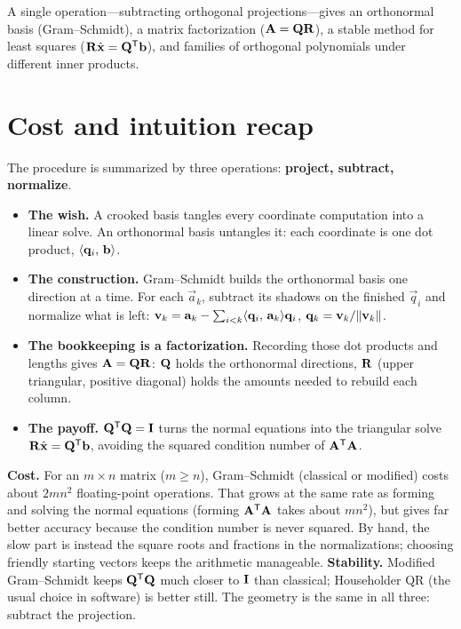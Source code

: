 \begin{aestheticbox}
A single operation---subtracting orthogonal projections---gives an orthonormal basis
(Gram--Schmidt), a matrix factorization ($\mathbf{A}=\mathbf{Q}\mathbf{R}$), a stable method for
least squares ($\mathbf{R}\hat{\mathbf{x}}=\mathbf{Q}^{\mathsf{T}}\mathbf{b}$), and families of orthogonal
polynomials under different inner products.
\end{aestheticbox}

\section{Cost and intuition recap}

The procedure is summarized by three operations: \textbf{project, subtract, normalize}.

\begin{itemize}
  \item \textbf{The wish.} A crooked basis tangles every coordinate computation into a
        linear solve. An orthonormal basis untangles it: each coordinate is one dot
        product, $\langle \mathbf{q}_i,\, \mathbf{b} \rangle$.
  \item \textbf{The construction.} Gram--Schmidt builds the orthonormal basis one
        direction at a time. For each $\vec{a}_k$, subtract its shadows on the finished
        $\vec{q}_i$ and normalize what is left:
        $\mathbf{v}_k=\mathbf{a}_k-\sum_{i<k}\langle \mathbf{q}_i,\, \mathbf{a}_k \rangle\mathbf{q}_i$,
        $\mathbf{q}_k=\mathbf{v}_k/\lVert\mathbf{v}_k\rVert$.
  \item \textbf{The bookkeeping is a factorization.} Recording those dot products and
        lengths gives $\mathbf{A}=\mathbf{Q}\mathbf{R}$: $\mathbf{Q}$ holds the orthonormal directions,
        $\mathbf{R}$ (upper triangular, positive diagonal) holds the amounts needed to rebuild each column.
  \item \textbf{The payoff.} $\mathbf{Q}^{\mathsf{T}}\mathbf{Q}=\mathbf{I}$ turns the normal equations into
        the triangular solve $\mathbf{R}\hat{\mathbf{x}}=\mathbf{Q}^{\mathsf{T}}\mathbf{b}$, avoiding the
        squared condition number of $\mathbf{A}^{\mathsf{T}}\mathbf{A}$.
\end{itemize}

\textbf{Cost.} For an $m\times n$ matrix ($m\ge n$), Gram--Schmidt (classical or
modified) costs about $2mn^2$ floating-point operations. That grows at the same rate as
forming and solving the normal equations (forming $\mathbf{A}^{\mathsf{T}}\mathbf{A}$ takes about $mn^2$),
but gives far better accuracy because the condition number is never squared. By hand,
the slow part is instead the square roots and
fractions in the normalizations; choosing friendly starting vectors keeps the arithmetic
manageable. \textbf{Stability.} Modified Gram--Schmidt keeps $\mathbf{Q}^{\mathsf{T}}\mathbf{Q}$ much closer to
$\mathbf{I}$ than classical; Householder QR (the usual choice in software) is better still. The
geometry is the same in all three: subtract the projection.


